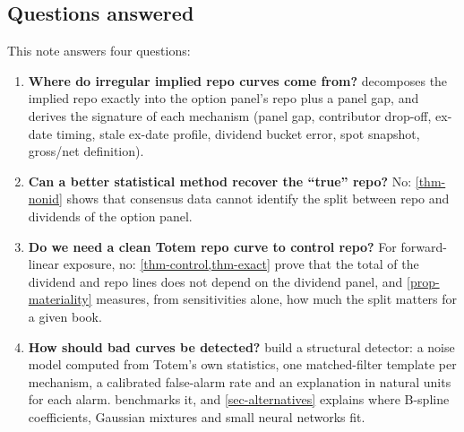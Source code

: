 \subsection{Questions answered}
This note answers four questions:
\begin{enumerate}[label=(\alph*)]
\item \textbf{Where do irregular implied repo curves come from?}  decomposes the implied repo
exactly into the option panel's repo plus a panel gap, and derives the signature of each mechanism (panel gap,
contributor drop-off, ex-date timing, stale ex-date profile, dividend bucket error, spot snapshot, gross/net
definition).
\item \textbf{Can a better statistical method recover the ``true'' repo?} No: \cref{thm-nonid} shows that
consensus data cannot identify the split between repo and dividends of the option panel.
\item \textbf{Do we need a clean Totem repo curve to control repo?} For forward-linear exposure, no:
\cref{thm-control,thm-exact} prove that the total of the dividend and repo lines does not depend on the dividend
panel, and \cref{prop-materiality} measures, from sensitivities alone, how much the split matters for a given book.
\item \textbf{How should bad curves be detected?}  build a structural detector:
a noise model computed from Totem's own statistics, one matched-filter template per mechanism, a calibrated
false-alarm rate and an explanation in natural units for each alarm.  benchmarks it, and
\cref{sec-alternatives} explains where B-spline coefficients, Gaussian mixtures and small neural networks fit.
\end{enumerate}

